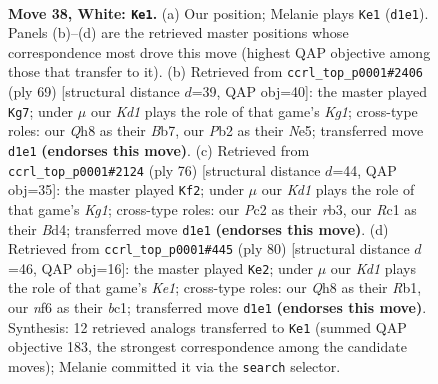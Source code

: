 \documentclass[11pt]{article}
\begin{document}
\clearpage

\begin{figure}[p]\centering
\begin{subfigure}{0.46\textwidth}\centering
\resizebox{\linewidth}{!}{%
\newchessgame
\chessboard[
  setfen={7Q/5k2/r4n2/1b1P4/p7/4p1p1/PPP3P1/2RK4 w - - 0 38},
  showmover=false,
  pgfstyle=straightmove, color=movearrow, markmove={d1-e1}
]}
\caption{}
\end{subfigure}\hfill
\begin{subfigure}{0.46\textwidth}\centering
\resizebox{\linewidth}{!}{%
\newchessgame
\chessboard[
  setfen={5rk1/pb3p2/8/3NnP2/1p5P/8/P1P1B3/2KR4 b - - 2 35},
  showmover=false,
  pgfstyle=straightmove, color=movearrow, markmove={g8-g7}
]}
\caption{}
\end{subfigure}
\\[4pt]
\begin{subfigure}{0.46\textwidth}\centering
\resizebox{\linewidth}{!}{%
\newchessgame
\chessboard[
  setfen={8/5k1p/1p1Pb3/p5p1/P2BR1P1/1r6/7P/6K1 w - - 2 39},
  showmover=false,
  pgfstyle=straightmove, color=movearrow, markmove={g1-f2}
]}
\caption{}
\end{subfigure}\hfill
\begin{subfigure}{0.46\textwidth}\centering
\resizebox{\linewidth}{!}{%
\newchessgame
\chessboard[
  setfen={8/7B/1p3p1p/2r5/1p1k3P/8/PP3P2/1Rb1K3 w - - 0 41},
  showmover=false,
  pgfstyle=straightmove, color=movearrow, markmove={e1-e2}
]}
\caption{}
\end{subfigure}
\caption{\textbf{Move 38, White: \texttt{Ke1}.} (a) Our position; Melanie plays \texttt{Ke1} (\texttt{d1e1}). Panels (b)--(d) are the retrieved master positions whose correspondence most drove this move (highest QAP objective among those that transfer to it). (b) Retrieved from \texttt{ccrl\_top\_p0001\#2406} (ply 69) [structural distance $d$=39, QAP obj=40]: the master played \texttt{Kg7}; under $\mu$ our \emph{Kd1} plays the role of that game's \emph{Kg1}; cross-type roles: our \emph{Q}h8 as their \emph{B}b7, our \emph{P}b2 as their \emph{N}e5; transferred move \texttt{d1e1} \textbf{(endorses this move)}. (c) Retrieved from \texttt{ccrl\_top\_p0001\#2124} (ply 76) [structural distance $d$=44, QAP obj=35]: the master played \texttt{Kf2}; under $\mu$ our \emph{Kd1} plays the role of that game's \emph{Kg1}; cross-type roles: our \emph{P}c2 as their \emph{r}b3, our \emph{R}c1 as their \emph{B}d4; transferred move \texttt{d1e1} \textbf{(endorses this move)}. (d) Retrieved from \texttt{ccrl\_top\_p0001\#445} (ply 80) [structural distance $d$=46, QAP obj=16]: the master played \texttt{Ke2}; under $\mu$ our \emph{Kd1} plays the role of that game's \emph{Ke1}; cross-type roles: our \emph{Q}h8 as their \emph{R}b1, our \emph{n}f6 as their \emph{b}c1; transferred move \texttt{d1e1} \textbf{(endorses this move)}. Synthesis: 12 retrieved analogs transferred to \texttt{Ke1} (summed QAP objective 183, the strongest correspondence among the candidate moves); Melanie committed it via the \texttt{search} selector.}
\label{fig:thought-m74}
\end{figure}
\end{document}
